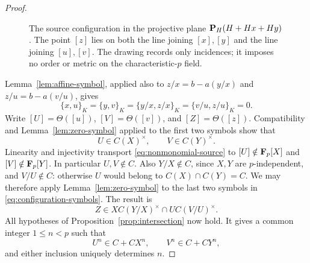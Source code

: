 \begin{proof}
\begin{figure}[htbp]
\centering
{}
\caption{The source configuration in the projective plane
$\mathbf P_H(H+Hx+Hy)$.  The point $[z]$ lies on both the line joining
$[x],[y]$ and the line joining $[u],[v]$.  The drawing records only
incidences; it imposes no order or metric on the characteristic-$p$
field.}
\label{fig:affine-configuration}
\end{figure}

Lemma~\ref{lem:affine-symbol}, applied also to
$z/x=b-a(y/x)$ and $z/u=b-a(v/u)$, gives
\begin{equation}\label{eq:configuration-symbols}
 \{x,u\}_K=\{y,v\}_K
 =\{y/x,z/x\}_K=\{v/u,z/u\}_K=0.
\end{equation}
Write $[U]=\Theta([u])$, $[V]=\Theta([v])$, and
$[Z]=\Theta([z])$.  Compatibility and
Lemma~\ref{lem:zero-symbol} applied to the first two symbols show that
\[
 U\in C(X)^\times,\qquad V\in C(Y)^\times.
\]
Linearity and injectivity transport \eqref{eq:nonmonomial-source} to
$[U]\notin\mathbf F_p[X]$ and $[V]\notin\mathbf F_p[Y]$.
In particular $U,V\notin C$.  Also $Y/X\notin C$, since $X,Y$ are
$p$-independent, and $V/U\notin C$: otherwise $U$ would belong to
$C(X)\cap C(Y)=C$.  We may therefore apply
Lemma~\ref{lem:zero-symbol} to the last two symbols in
\eqref{eq:configuration-symbols}.  The result is
\[
 Z\in X C(Y/X)^\times\cap U C(V/U)^\times.
\]
All hypotheses of Proposition~\ref{prop:intersection} now hold.  It
gives a common integer $1\le n<p$ such that
\begin{equation}\label{eq:local-line-powers}
 U^n\in C+C X^n,\qquad V^n\in C+C Y^n,
\end{equation}
and either inclusion uniquely determines $n$.


\end{proof}
